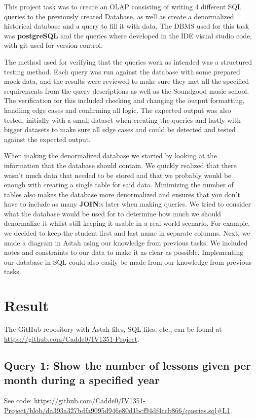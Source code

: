 \documentclass[a4paper]{scrartcl}
\begin{document}
This project task was to create an OLAP consisting of writing 4 different SQL queries to the previously created Database, as well as create a denormalized historical database and a query to fill it with data. The DBMS used for this task was \textbf{postgreSQL} and the queries where developed in the IDE visual studio code, with git used for version control. 

The method used for verifying that the queries work as intended was a structured testing method. Each query was run against the database with some prepared mock data, and the results were reviewed to make sure they met all the specified requirements from the query descriptions as well as the Soundgood music school. The verification for this included checking and changing the output formatting, handling edge cases and confirming all logic. The expected output was also tested, initially with a small dataset when creating the queries and lastly with bigger datasets to make sure all edge cases and could be detected and tested against the expected output.
 
When making the denormalized database we started by looking at the information that the database should contain. We quickly realized that there wasn't much data that needed to be stored and that we probably would be enough with creating a single table for said data. Minimizing the number of tables also makes the database more denormalized and ensures that you don't have to include as many \textbf{JOIN}:s later when making queries. We tried to consider what the database would be used for to determine how much we should denormalize it whilst still keeping it usable in a real-world scenario. For example, we decided to keep the student first and last name in separate columns. Next, we made a diagram in Astah using our knowledge from previous tasks. We included notes and constraints to our data to make it as clear as possible. Implementing our database in SQL could also easily be made from our knowledge from previous tasks.

\section{Result}

The GitHub repository with Astah files, SQL files, etc., can be found at \url{https://github.com/Cadde0/IV1351-Project}.

\subsection{Query 1: Show the number of lessons given per month during a specified year}
See code: \url{https://github.com/Cadde0/IV1351-Project/blob/da393a327bdfa9095d946e80d1bcf94df4ccb866/queries.sql#L1}.
\end{document}
